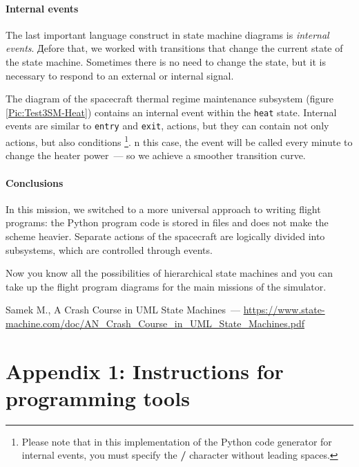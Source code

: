 \documentclass[12pt,a4paper]{article}
\begin{document}
\paragraph{Internal events}

The last important language construct in state machine diagrams is \emph{internal events}. Дefore that, we worked with transitions that change the current state of the state machine. Sometimes there is no need to change the state, but it is necessary to respond to an external or internal signal.

The diagram of the spacecraft thermal regime maintenance subsystem (figure \ref{Pic:Test3SM-Heat})
contains an internal event within the \verb'heat' state. Internal events are similar to \verb'entry' and \verb'exit', actions, but they can contain not only actions, but also
conditions \footnote{Please note that in this implementation of the Python code generator for internal events, you must specify the \textbf{/} character without leading spaces.}. n this case, the event will be called every minute to change the heater power~--- so we achieve a smoother transition curve.

\paragraph{Conclusions}

In this mission, we switched to a more universal approach to writing flight programs: the Python program code is stored in files and does not make the scheme heavier. Separate actions of the spacecraft are logically divided into subsystems, which are controlled through events.

Now you know all the possibilities of hierarchical state machines and you can take up the flight program diagrams for the main missions of the simulator.

\begin{thebibliography}{2}
 Samek M., A Crash Course in UML State Machines~---
  \url{https://www.state-machine.com/doc/AN_Crash_Course_in_UML_State_Machines.pdf}
\end{thebibliography}

\clearpage
\section*{Appendix 1: Instructions for programming tools}
\end{document}
